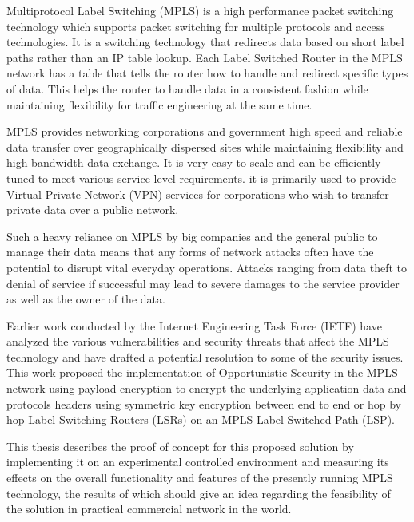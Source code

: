 \documentclass[a4paper, 12pt, oneside]{report}         %
\begin{document}
\begin{thesisabstract}                          %

Multiprotocol Label Switching (MPLS) is a high performance packet switching technology which supports packet switching for multiple protocols and access technologies. It is a switching technology that redirects data based on short label paths rather than an IP table lookup. Each Label Switched Router in the MPLS network has a table that tells the router how to handle and redirect specific types of data. This helps the router to handle data in a consistent fashion while maintaining flexibility for traffic engineering at the same time.

MPLS provides networking corporations and government high speed and reliable data transfer over geographically dispersed sites while maintaining flexibility and high bandwidth data exchange. It is very easy to scale and can be efficiently tuned to meet various service level requirements. it is primarily used to provide Virtual Private Network (VPN) services for corporations who wish to transfer private data over a public network.

Such a heavy reliance on MPLS by big companies and the general public to manage their data means that any forms of network attacks often have the potential to disrupt vital everyday operations. Attacks ranging from data theft to denial of service if successful may lead to severe damages to the service provider as well as the owner of the data.

Earlier work conducted by the Internet Engineering Task Force (IETF) have analyzed the various vulnerabilities and security threats that affect the MPLS technology and have drafted a potential resolution to some of the security issues. This work proposed the implementation of Opportunistic Security in the MPLS network using payload encryption to encrypt the underlying application data and protocols headers using symmetric key encryption between end to end or hop by hop Label Switching Routers (LSRs) on an MPLS Label Switched Path (LSP).

This thesis describes the proof of concept for this proposed solution by implementing it on an experimental controlled environment and measuring its effects on the overall functionality and features of the presently running MPLS technology, the results of which should give an idea regarding the feasibility of the solution in practical commercial network in the world.  
\end{thesisabstract}
\end{document}
